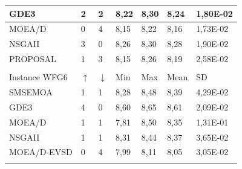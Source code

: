 \begin{table}[H]
\begin{scriptsize}
{\begin{tabular}{lllllll}
\multicolumn{1}{|l|}{GDE3} & \multicolumn{1}{l|}{2} & \multicolumn{1}{l|}{2} & \multicolumn{1}{l|}{8,22} & \multicolumn{1}{l|}{8,30} & \multicolumn{1}{l|}{8,24} & \multicolumn{1}{l|}{1,80E-02} \\ \hline
\multicolumn{1}{|l|}{MOEA/D} & \multicolumn{1}{l|}{0} & \multicolumn{1}{l|}{4} & \multicolumn{1}{l|}{8,15} & \multicolumn{1}{l|}{8,22} & \multicolumn{1}{l|}{8,16} & \multicolumn{1}{l|}{1,73E-02} \\ \hline
\multicolumn{1}{|l|}{NSGAII} & \multicolumn{1}{l|}{3} & \multicolumn{1}{l|}{0} & \multicolumn{1}{l|}{8,26} & \multicolumn{1}{l|}{8,30} & \multicolumn{1}{l|}{8,28} & \multicolumn{1}{l|}{1,90E-02} \\ \hline
\multicolumn{1}{|l|}{PROPOSAL} & \multicolumn{1}{l|}{1} & \multicolumn{1}{l|}{3} & \multicolumn{1}{l|}{8,15} & \multicolumn{1}{l|}{8,26} & \multicolumn{1}{l|}{8,19} & \multicolumn{1}{l|}{2,58E-02} \\ \hline
 &  &  &  &  &  &  \\ \hline
 \multicolumn{1}{|l|}{Instance WFG6} & \multicolumn{1}{l|}{$\uparrow$} & \multicolumn{1}{l|}{$\downarrow$} & \multicolumn{1}{l|}{Min} & \multicolumn{1}{l|}{Max} & \multicolumn{1}{l|}{Mean} & \multicolumn{1}{l|}{SD} \\ \hline
 \multicolumn{1}{|l|}{SMSEMOA} & \multicolumn{1}{l|}{1} & \multicolumn{1}{l|}{1} & \multicolumn{1}{l|}{8,28} & \multicolumn{1}{l|}{8,48} & \multicolumn{1}{l|}{8,39} & \multicolumn{1}{l|}{4,29E-02} \\ \hline
 \multicolumn{1}{|l|}{GDE3} & \multicolumn{1}{l|}{4} & \multicolumn{1}{l|}{0} & \multicolumn{1}{l|}{8,60} & \multicolumn{1}{l|}{8,65} & \multicolumn{1}{l|}{8,61} & \multicolumn{1}{l|}{2,09E-02} \\ \hline
 \multicolumn{1}{|l|}{MOEA/D} & \multicolumn{1}{l|}{1} & \multicolumn{1}{l|}{1} & \multicolumn{1}{l|}{7,81} & \multicolumn{1}{l|}{8,50} & \multicolumn{1}{l|}{8,35} & \multicolumn{1}{l|}{1,31E-01} \\ \hline
 \multicolumn{1}{|l|}{NSGAII} & \multicolumn{1}{l|}{1} & \multicolumn{1}{l|}{1} & \multicolumn{1}{l|}{8,31} & \multicolumn{1}{l|}{8,44} & \multicolumn{1}{l|}{8,37} & \multicolumn{1}{l|}{3,65E-02} \\ \hline
 \multicolumn{1}{|l|}{MOEA/D-EVSD} & \multicolumn{1}{l|}{0} & \multicolumn{1}{l|}{4} & \multicolumn{1}{l|}{7,99} & \multicolumn{1}{l|}{8,11} & \multicolumn{1}{l|}{8,05} & \multicolumn{1}{l|}{3,05E-02} \\ \hline
  &  &  &  &  &  &  \\ \hline

\end{tabular}}
\end{scriptsize}
\end{table}
